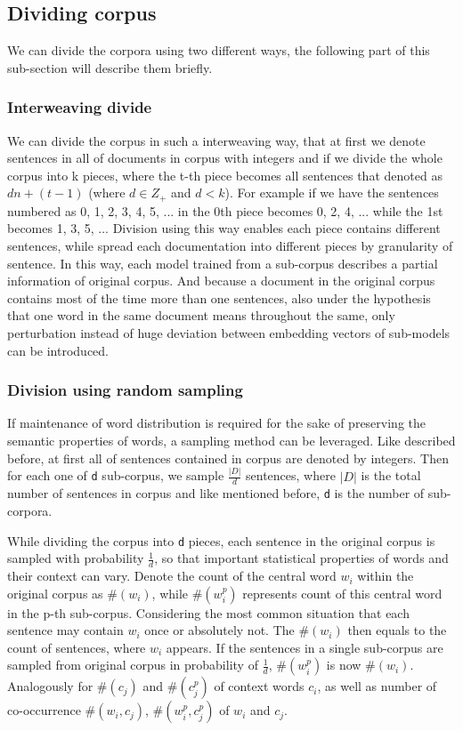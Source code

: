 \subsection{Dividing corpus}
	We can divide the corpora using two different ways, the following part of this sub-section will describe them briefly.
	
	\subsubsection{Interweaving divide}
	We can divide the corpus in such a interweaving way, that at first we denote sentences in all of documents in corpus with integers and if we divide the whole corpus into k pieces, where the t-th piece becomes all sentences that denoted as $dn+(t-1)$ (where $d\in Z_+$ and $d<k$). For example if we have the sentences numbered as 0, 1, 2, 3, 4, 5, ... in the 0th piece becomes 0, 2, 4, ... while the 1st becomes 1, 3, 5, ... Division using this way enables each piece contains different sentences, while spread each documentation into different pieces by granularity of sentence. In this way, each model trained from a sub-corpus describes a partial information of original corpus. And because a document in the original corpus contains most of the time more than one sentences, also under the hypothesis that one word in the same document means throughout the same, only perturbation instead of huge deviation between embedding vectors of sub-models can be introduced.
	
	\subsubsection{Division using random sampling}\label{sss:random_sampling}
	If maintenance of word distribution is required for the sake of preserving the semantic properties of words, a sampling method can be leveraged. Like described before, at first all of sentences contained in corpus are denoted by integers. Then for each one of \verb|d| sub-corpus, we sample $\frac{|D|}{d}$ sentences, where $|D|$ is the total number of sentences in corpus and like mentioned before, \verb|d| is the number of sub-corpora.

	While dividing the corpus into \verb|d| pieces, each sentence in the original corpus is sampled with probability $\frac{1}{d}$, so that important statistical properties of words and their context can vary. Denote the count of the central word $w_i$ within the original corpus as $\#(w_i)$, while $\#(w_i^p)$ represents count of this central word in the p-th sub-corpus. Considering the most common situation that each sentence may contain $w_i$ once or absolutely not. The $\#(w_i)$ then equals to the count of sentences, where $w_i$ appears. If the sentences in a single sub-corpus are sampled from original corpus in probability of $\frac{1}{d}$, $\#(w_i^p)$ is now $\#(w_i)$. Analogously for $\#(c_j)$ and $\#(c_j^p)$ of context words $c_i$, as well as number of co-occurrence $\#(w_i, c_j)$, $\#(w_i^p, c_j^p)$ of $w_i$ and $c_j$.
